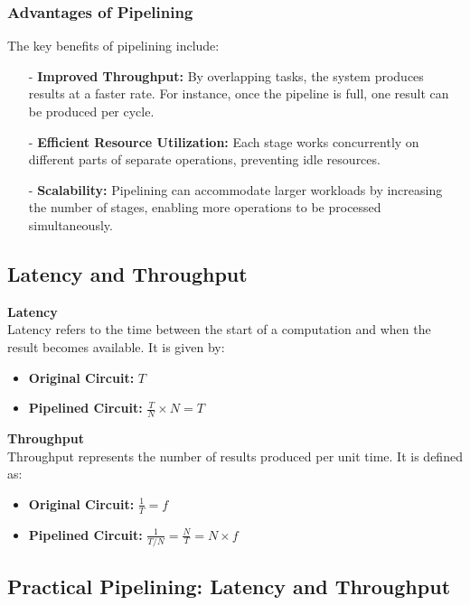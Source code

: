 \subsubsection*{Advantages of Pipelining}
The key benefits of pipelining include:
\begin{itemize}
    \item[-] \textbf{Improved Throughput:} By overlapping tasks, the system produces results at a faster rate. For instance, once the pipeline is full, one result can be produced per cycle.
    \item[-] \textbf{Efficient Resource Utilization:} Each stage works concurrently on different parts of separate operations, preventing idle resources.
    \item[-] \textbf{Scalability:} Pipelining can accommodate larger workloads by increasing the number of stages, enabling more operations to be processed simultaneously.
\end{itemize}

\subsection{Latency and Throughput}
\noindent \textbf{Latency} \\
Latency refers to the time between the start of a computation and when the result becomes available. It is given by:
\begin{itemize}
    \item \textbf{Original Circuit:} \( T \)
    \item \textbf{Pipelined Circuit:} \( \frac{T}{N} \times N = T \)
\end{itemize}

\noindent \textbf{Throughput} \\
Throughput represents the number of results produced per unit time. It is defined as:
\begin{itemize}
    \item \textbf{Original Circuit:} \( \frac{1}{T} = f \)
    \item \textbf{Pipelined Circuit:} \( \frac{1}{T/N} = \frac{N}{T} = N \times f \)
\end{itemize}

\subsection{Practical Pipelining: Latency and Throughput}
